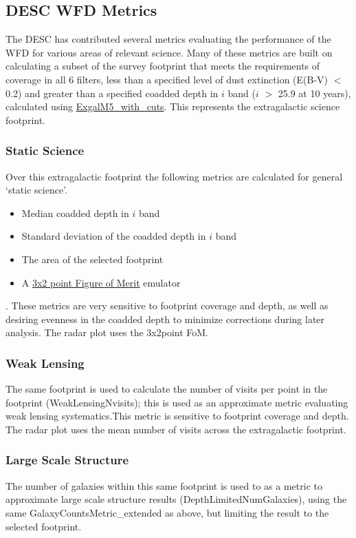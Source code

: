 \subsection{DESC WFD Metrics}

The DESC has contributed several metrics evaluating the performance of the WFD for various areas of relevant science. Many of these metrics are built on calculating a subset of the survey footprint that meets the requirements of coverage in all 6 filters, less than a specified level of dust extinction (E(B-V) $<$ 0.2) and greater than a specified coadded depth in $i$ band ($i$ $>$ 25.9 at 10 years), calculated using \href{https://github.com/lsst/sims_maf/blob/master/python/lsst/sims/maf/metrics/weakLensingSystematicsMetric.py#L8}{ExgalM5\_with\_cuts}. This represents the extragalactic science footprint. 

\subsubsection{Static Science}
Over this extragalactic footprint the following metrics are calculated for general `static science'.
\begin{itemize}
\item Median coadded depth in $i$ band
\item Standard deviation of the coadded depth in $i$ band
\item The area of the selected footprint
\item A \href{https://github.com/lsst/sims_maf/blob/master/python/lsst/sims/maf/metrics/summaryMetrics.py#L231}{3x2 point Figure of Merit} emulator
\end{itemize}. 
These metrics are very sensitive to footprint coverage and depth, as well as desiring evenness in the coadded depth to minimize corrections during later analysis.
The radar plot uses the 3x2point FoM. 

\subsubsection{Weak Lensing}
The same footprint is used to calculate the number of visits per point in the footprint (WeakLensingNvisits); this is used as an approximate metric evaluating weak lensing systematics.This metric is sensitive to footprint coverage and depth. 
The radar plot uses the mean number of visits across the extragalactic footprint. 

\subsubsection{Large Scale Structure}
The number of galaxies within this same footprint is used to as a metric to approximate large scale structure results (DepthLimitedNumGalaxies), using the same GalaxyCountsMetric\_extended as above, but limiting the result to the selected footprint. 

